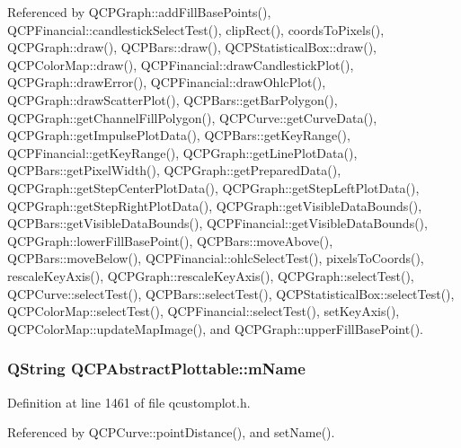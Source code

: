 Referenced by Q\+C\+P\+Graph\+::add\+Fill\+Base\+Points(), Q\+C\+P\+Financial\+::candlestick\+Select\+Test(), clip\+Rect(), coords\+To\+Pixels(), Q\+C\+P\+Graph\+::draw(), Q\+C\+P\+Bars\+::draw(), Q\+C\+P\+Statistical\+Box\+::draw(), Q\+C\+P\+Color\+Map\+::draw(), Q\+C\+P\+Financial\+::draw\+Candlestick\+Plot(), Q\+C\+P\+Graph\+::draw\+Error(), Q\+C\+P\+Financial\+::draw\+Ohlc\+Plot(), Q\+C\+P\+Graph\+::draw\+Scatter\+Plot(), Q\+C\+P\+Bars\+::get\+Bar\+Polygon(), Q\+C\+P\+Graph\+::get\+Channel\+Fill\+Polygon(), Q\+C\+P\+Curve\+::get\+Curve\+Data(), Q\+C\+P\+Graph\+::get\+Impulse\+Plot\+Data(), Q\+C\+P\+Bars\+::get\+Key\+Range(), Q\+C\+P\+Financial\+::get\+Key\+Range(), Q\+C\+P\+Graph\+::get\+Line\+Plot\+Data(), Q\+C\+P\+Bars\+::get\+Pixel\+Width(), Q\+C\+P\+Graph\+::get\+Prepared\+Data(), Q\+C\+P\+Graph\+::get\+Step\+Center\+Plot\+Data(), Q\+C\+P\+Graph\+::get\+Step\+Left\+Plot\+Data(), Q\+C\+P\+Graph\+::get\+Step\+Right\+Plot\+Data(), Q\+C\+P\+Graph\+::get\+Visible\+Data\+Bounds(), Q\+C\+P\+Bars\+::get\+Visible\+Data\+Bounds(), Q\+C\+P\+Financial\+::get\+Visible\+Data\+Bounds(), Q\+C\+P\+Graph\+::lower\+Fill\+Base\+Point(), Q\+C\+P\+Bars\+::move\+Above(), Q\+C\+P\+Bars\+::move\+Below(), Q\+C\+P\+Financial\+::ohlc\+Select\+Test(), pixels\+To\+Coords(), rescale\+Key\+Axis(), Q\+C\+P\+Graph\+::rescale\+Key\+Axis(), Q\+C\+P\+Graph\+::select\+Test(), Q\+C\+P\+Curve\+::select\+Test(), Q\+C\+P\+Bars\+::select\+Test(), Q\+C\+P\+Statistical\+Box\+::select\+Test(), Q\+C\+P\+Color\+Map\+::select\+Test(), Q\+C\+P\+Financial\+::select\+Test(), set\+Key\+Axis(), Q\+C\+P\+Color\+Map\+::update\+Map\+Image(), and Q\+C\+P\+Graph\+::upper\+Fill\+Base\+Point().

\hypertarget{class_q_c_p_abstract_plottable_ac29ffef424e2488675930de18cde612a}{}
\subsubsection[{m\+Name}]{\setlength{\rightskip}{0pt plus 5cm}Q\+String Q\+C\+P\+Abstract\+Plottable\+::m\+Name\hspace{0.3cm}{\ttfamily [protected]}}\label{class_q_c_p_abstract_plottable_ac29ffef424e2488675930de18cde612a}


Definition at line 1461 of file qcustomplot.\+h.



Referenced by Q\+C\+P\+Curve\+::point\+Distance(), and set\+Name().

